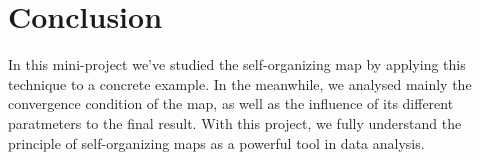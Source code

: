 \documentclass[a4paper, 12pt]{article}
\begin{document}
\section{Conclusion}

In this mini-project we've studied the self-organizing map by applying
this technique to a concrete example. In the meanwhile, we analysed
mainly the convergence condition of the map, as well as the influence of its
different paratmeters to the final result. With this project, we fully
understand the principle of self-organizing maps as a powerful tool in
data analysis.
\end{document}
